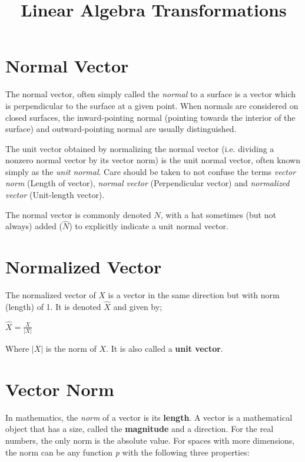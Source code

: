 \documentclass[12pt]{article}
\title{Linear Algebra Transformations}
\date{}
\begin{document}
    \maketitle

    \tableofcontents

\newpage

\section{Normal Vector}


The normal vector, often simply called the \textit{normal} to a surface is a vector which is perpendicular to the surface at a given point. When normals are considered on closed surfaces, the inward-pointing normal (pointing towards the interior of the surface) and outward-pointing normal are usually distinguished.

The unit vector obtained by normalizing the normal vector (i.e. dividing a nonzero normal vector by its vector norm) is the unit normal vector, often known simply as the \textit{unit normal}. Care should be taken to not confuse the terms \textit{vector norm} (Length of vector), \textit{normal vector} (Perpendicular vector) and \textit{normalized vector} (Unit-length vector).

The normal vector is commonly denoted $N$, with a hat sometimes (but not always) added ($\hat{N}$) to explicitly indicate a unit normal vector.


\section{Normalized Vector}

The normalized vector of $X$ is a vector in the same direction but with norm (length) of 1. It is denoted $\hat{X}$ and given by;

\begin{center}
    $\hat{X} = \frac{X}{\vert X \vert}$
\end{center}

Where $\vert X \vert$ is the norm of $X$. It is also called a \textbf{unit vector}.

\section{Vector Norm}

In mathematics, the \textit{norm} of a vector is its \textbf{length}. A vector is a mathematical object that has a size, called the \textbf{magnitude} and a direction. For the real numbers, the only norm is the absolute value. For spaces with more dimensions, the norm can be any function \textit{p} with the following three properties:
\end{document}
